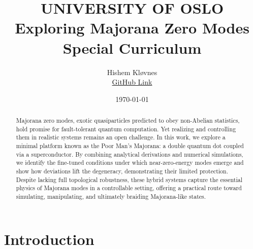\documentclass[11pt, letterpaper, titlepage]{article}
\title{
 \textbf{\LARGE UNIVERSITY OF OSLO} \\
\vspace{37mm}
\textbf{\Large Exploring Majorana Zero Modes}\\
\vspace{7mm}
\Large Special Curriculum \\
\vspace{25mm}
}
\author{\Large Hishem Kløvnes \\ \textcolor{blue}{\href{https://github.com/hishemok/Special_curriculum}{GitHub Link} }}
\date{\Large \today} %
\begin{document}
\sloppy
\maketitle
\newpage

\begin{abstract}
  Majorana zero modes, exotic quasiparticles predicted to obey non-Abelian statistics, hold promise for fault-tolerant quantum computation. Yet realizing and controlling them in realistic systems remains an open challenge. In this work, we explore a minimal platform known as the Poor Man’s Majorana: a double quantum dot coupled via a superconductor. By combining analytical derivations and numerical simulations, we identify the fine-tuned conditions under which near-zero-energy modes emerge and show how deviations lift the degeneracy, demonstrating their limited protection. Despite lacking full topological robustness, these hybrid systems capture the essential physics of Majorana modes in a controllable setting, offering a practical route toward simulating, manipulating, and ultimately braiding Majorana-like states.
\end{abstract}

\tableofcontents
\newpage
\section{Introduction}
\end{document}
